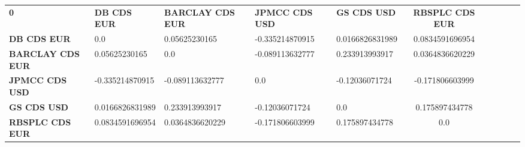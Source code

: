 \begin{center}
 \begin{tabular}{|l|l|l|l|l|c|c|c|c|c|}
\hline
\textbf{0} & \textbf{DB CDS EUR} & \textbf{BARCLAY CDS EUR} & \textbf{JPMCC CDS USD} & \textbf{GS CDS USD} & \textbf{RBSPLC CDS EUR}\\\hhline{|=|=|=|=|=|=|}
\textbf{DB CDS EUR} & 0.0 & 0.05625230165 & -0.335214870915 & 0.0166826831989 & 0.0834591696954\\
\textbf{BARCLAY CDS EUR} & 0.05625230165 & 0.0 & -0.089113632777 & 0.233913993917 & 0.0364836620229\\
\textbf{JPMCC CDS USD} & -0.335214870915 & -0.089113632777 & 0.0 & -0.12036071724 & -0.171806603999\\
\textbf{GS CDS USD} & 0.0166826831989 & 0.233913993917 & -0.12036071724 & 0.0 & 0.175897434778\\
\textbf{RBSPLC CDS EUR} & 0.0834591696954 & 0.0364836620229 & -0.171806603999 & 0.175897434778 & 0.0\\
\hline
\end{tabular}
\end{center}